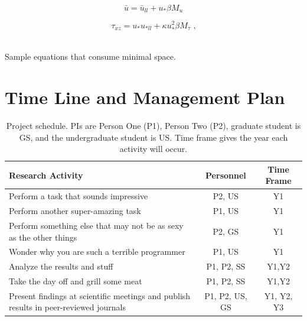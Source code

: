 \begin{center}
\begin{minipage}{.3\textwidth}
\begin{equation}
 \bar u = \bar u_{ll} + u_* \beta M_{u} \label{new_u}
\end{equation}
\end{minipage}
\begin{minipage}{.36\linewidth}
\begin{equation}
  \tau_{xz} = u_* u_{*ll} + \kappa u_*^2 \beta M_{\tau} \label{new_tau} \mbox{ ,}
\end{equation}
\end{minipage}
~\\Sample equations that consume minimal space.
\end{center}



\section{Time Line and Management Plan}

\begin{table}[H]
\label{table1}
\renewcommand{\arraystretch}{0}
\caption{Project schedule.  PIs are Person One (P1), Person Two (P2), graduate student is GS, and the undergraduate student is US\@. Time frame gives the year each activity will occur.}
\scriptsize
\begin{tabularx}{\textwidth}{Y c c }
\hline
\hline
\textbf{Research Activity} & \textbf{Personnel} & \textbf{Time Frame}\\
\hline
Perform a task that sounds impressive & P2, US & Y1 \T\\
Perform another super-amazing task & P1, US & Y1 \T\\
Perform something else that may not be as sexy as the other things & P2, GS & Y1 \T\\
Wonder why you are such a terrible programmer & P1, US & Y1 \T\\
Analyze the results and stuff & P1, P2, SS & Y1,Y2 \T\\
Take the day off and grill some meat & P1, P2, SS & Y1,Y2 \T\\
Present findings at scientific meetings and publish results in peer-reviewed journals & P1, P2, US, GS & Y1, Y2, Y3\T\B\\
\hline
\hline
\end{tabularx}
\end{table}

